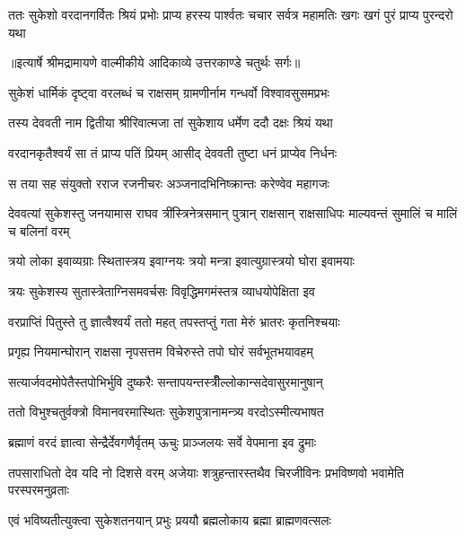 \fourlineindentedshloka
{ततः सुकेशो वरदानगर्वितः}
{श्रियं प्रभोः प्राप्य हरस्य पार्श्वतः}
{चचार सर्वत्र महामतिः खगः}
{खगं पुरं प्राप्य पुरन्दरो यथा} %


{॥इत्यार्षे श्रीमद्रामायणे वाल्मीकीये आदिकाव्ये उत्तरकाण्डे चतुर्थः सर्गः॥}


\twolineshloka
{सुकेशं धार्मिकं दृष्ट्वा वरलब्धं च राक्षसम्}
{ग्रामणीर्नाम गन्धर्वो विश्वावसुसमप्रभः} %

\twolineshloka
{तस्य देववती नाम द्वितीया श्रीरिवात्मजा}
{तां सुकेशाय धर्मेण ददौ दक्षः श्रियं यथा} %

\twolineshloka
{वरदानकृतैश्वर्यं सा तं प्राप्य पतिं प्रियम्}
{आसीद् देववती तुष्टा धनं प्राप्येव निर्धनः} %

\twolineshloka
{स तया सह संयुक्तो रराज रजनीचरः}
{अञ्जनादभिनिष्क्रान्तः करेण्वेव महागजः} %

\threelineshloka
{देववत्यां सुकेशस्तु जनयामास राघव}
{त्रींस्त्रिनेत्रसमान् पुत्रान् राक्षसान् राक्षसाधिपः}
{माल्यवन्तं सुमालिं च मालिं च बलिनां वरम्} %

\twolineshloka
{त्रयो लोका इवाव्यग्राः स्थितास्त्रय इवाग्नयः}
{त्रयो मन्त्रा इवात्युग्रास्त्रयो घोरा इवामयाः} %

\twolineshloka
{त्रयः सुकेशस्य सुतास्त्रेताग्निसमवर्चसः}
{विवृद्धिमगमंस्तत्र व्याधयोपेक्षिता इव} %

\twolineshloka
{वरप्राप्तिं पितुस्ते तु ज्ञात्वैश्वर्यं ततो महत्}
{तपस्तप्तुं गता मेरुं भ्रातरः कृतनिश्चयाः} %

\twolineshloka
{प्रगृह्य नियमान्घोरान् राक्षसा नृपसत्तम}
{विचेरुस्ते तपो घोरं सर्वभूतभयावहम्} %

\twolineshloka
{सत्यार्जवदमोपेतैस्तपोभिर्भुवि दुष्करैः}
{सन्तापयन्तस्त्रीँल्लोकान्सदेवासुरमानुषान्} %

\twolineshloka
{ततो विभुश्चतुर्वक्त्रो विमानवरमास्थितः}
{सुकेशपुत्रानामन्त्र्य वरदोऽस्मीत्यभाषत} %

\twolineshloka
{ब्रह्माणं वरदं ज्ञात्वा सेन्द्रैर्देवगणैर्वृतम्}
{ऊचुः प्राञ्जलयः सर्वे वेपमाना इव द्रुमाः} %

\threelineshloka
{तपसाराधितो देव यदि नो दिशसे वरम्}
{अजेयाः शत्रुहन्तारस्तथैव चिरजीविनः}
{प्रभविष्णवो भवामेति परस्परमनुव्रताः} %

\twolineshloka
{एवं भविष्यतीत्युक्त्वा सुकेशतनयान् प्रभुः}
{प्रययौ ब्रह्मलोकाय ब्रह्मा ब्राह्मणवत्सलः} %

